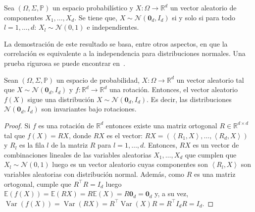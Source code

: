 \begin{proposition}\label{prop:independence}
	Sea $\left(\Omega,\Sigma,\mathbb{P}\right)$ un espacio
	probabilístico y $X\colon\Omega\to\mathbb{R}^{d}$ un vector
	aleatorio de componentes $X_{1},\dotsc,X_{d}$.
	Se tiene que, $X\sim\mathcal{N}\left(\symbf{0}_{d},I_{d}\right)$ si
	y solo si para todo $l=1,\dotsc,d$:
	$X_{l}\sim\mathcal{N}\left(0,1\right)$ e independientes.
\end{proposition}

La demostración de este resultado se basa, entre otros aspectos,
en que la correlación es equivalente a la independencia para
distribuciones normales.
Una prueba rigurosa se puede encontrar en~\cite{Gut2013}.

\begin{proposition}
	Sean $\left(\Omega,\Sigma,\mathbb{P}\right)$ un espacio de
	probabilidad, $X\colon\Omega\to\mathbb{R}^{d}$ un vector aleatorio
	tal que $X\sim\mathcal{N}\left(\symbf{0}_{d},I_{d}\right)$ y
	$f\colon\mathbb{R}^{d}\to\mathbb{R}^{d}$ una rotación.
	Entonces, el vector aleatorio $f\left(X\right)$ sigue una
	distribución $X\sim\mathcal{N}\left(\symbf{0}_{d},I_{d}\right)$.
	Es decir, las distribuciones
	$\mathcal{N}\left(\symbf{0}_{d},I_{d}\right)$ son invariantes bajo
	rotaciones.
\end{proposition}

\begin{proof}
	Si $f$ es una rotación de $\mathbb{R}^{d}$ entonces existe una
	matriz ortogonal $R\in\mathbb{R}^{d\times d}$ tal que
	$f\left(X\right)=RX$, donde $RX$ es el vector:
	\begin{math}
		RX=
		\left(
		\left\langle R_{1},X\right\rangle,
		\dotsc,
		\left\langle R_{d},X\right\rangle
		\right)
	\end{math}
	y $R_l$ es la
	fila $l$ de la matriz $R$ para $l=1,\dotsc,d$.
	Entonces, $RX$ es un vector de combinaciones lineales de las
	variables aleatorias $X_{1},\dotsc,X_{d}$ que cumplen que
	$X_{l}\sim\mathcal{N}(0, 1)$ luego es un vector aleatorio cuyas
	componentes son $\left\langle R_{l},X\right\rangle$ son variables
	aleatorias con distribución normal.
	Además, como $R$ es una matriz ortogonal, cumple que
	$R^{\top}R=I_{d}$ luego
	\begin{math}
		\mathbb{E}\left(f\left(X\right)\right)=
		\mathbb{E}\left(RX\right)=
		R\mathbb{E}\left(X\right)=
		R\symbf{0}_{d}=
		\symbf{0}_{d}
	\end{math}
	y, a su vez,
	\begin{math}
		\operatorname{Var}\left(f\left(X\right)\right)=
		\operatorname{Var}\left(RX\right)=
		R^{\top}
		\operatorname{Var}\left(X\right)R=
		R^{\top}
		I_{d}R=
		I_{d}
	\end{math}.
\end{proof}


